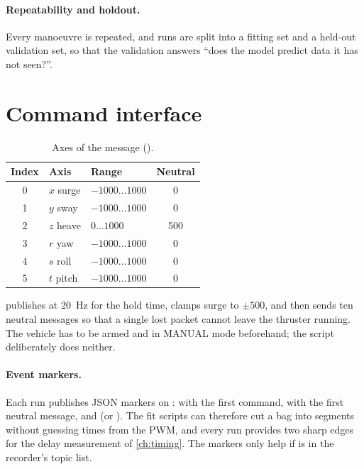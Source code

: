 \paragraph{Repeatability and holdout.} Every manoeuvre is repeated, and runs are split into a
fitting set and a held-out validation set, so that the validation answers ``does the model
predict data it has not seen?''.

\section{Command interface}

\begin{table}[htbp]
\centering
\caption{Axes of the  message ().}
\label{tab:axes}
\begin{tabular}{@{}c l l c@{}}
\toprule
Index & Axis & Range & Neutral \\
\midrule
0 & $x$ surge & $-1000 \dots 1000$ & 0 \\
1 & $y$ sway  & $-1000 \dots 1000$ & 0 \\
2 & $z$ heave & $0 \dots 1000$ & 500 \\
3 & $r$ yaw   & $-1000 \dots 1000$ & 0 \\
4 & $s$ roll  & $-1000 \dots 1000$ & 0 \\
5 & $t$ pitch & $-1000 \dots 1000$ & 0 \\
\bottomrule
\end{tabular}
\end{table}
\FloatBarrier

 publishes \code{[surge, 0, 500, 0, 0, 0]} at
\qty{20}{\hertz} for the hold time, clamps surge to $\pm500$, and then sends ten neutral
messages so that a single lost packet cannot leave the thruster running. The vehicle has to
be armed and in MANUAL mode beforehand; the script deliberately does neither.

\paragraph{Event markers.} Each run publishes JSON markers on :
 with the first command,  with the first neutral message,
and  (or ). The fit scripts can therefore cut a bag into
segments without guessing times from the PWM, and every run provides two sharp edges for
the delay measurement of \cref{ch:timing}. The markers only help if  is
in the recorder's topic list.

